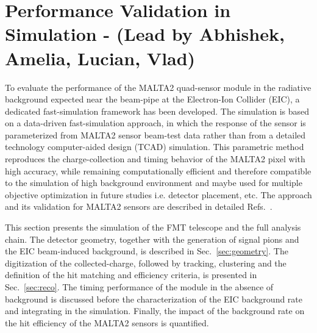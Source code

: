 \section{Performance Validation in Simulation - (Lead by Abhishek, Amelia, Lucian, Vlad)}\label{sec:mc}

To evaluate the performance of the MALTA2 quad-sensor module in the radiative
background expected near the beam-pipe at the Electron-Ion Collider (EIC), a
dedicated fast-simulation framework has been developed. The simulation is
based on a data-driven fast-simulation approach, in which the response
of the sensor is parameterized from MALTA2 sensor beam-test data rather than
from a detailed technology computer-aided design (TCAD) simulation. This parametric method reproduces the
charge-collection and timing behavior of the MALTA2 pixel with high accuracy, while remaining computationally efficient and therefore compatible to the simulation of high background environment and maybe used for multiple objective optimization in future studies i.e. detector placement, etc. The approach and its validation for MALTA2 sensors are
described in detailed Refs.~\cite{FastSim,MALTA2_CCParameterization}.

This section presents the simulation of the FMT telescope and the full analysis chain. The detector geometry, together with the generation of signal pions and the EIC beam-induced background, is described in Sec.~\ref{sec:geometry}. The digitization of the collected-charge, followed by tracking, clustering and the definition of the hit matching and efficiency criteria, is presented in Sec.~\ref{sec:reco}.
The timing performance of the module in the absence of background is discussed before the characterization of the EIC background rate and integrating in the simulation. Finally, the impact of the background rate on the hit efficiency of the MALTA2 sensors is quantified.

